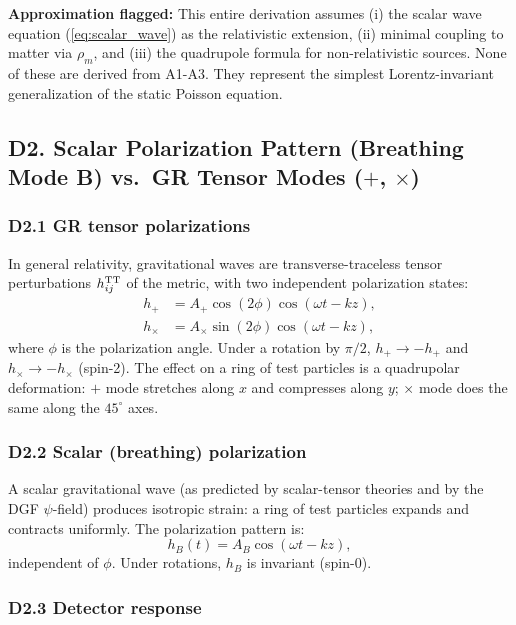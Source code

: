 \documentclass[reprint]{revtex4-2}
\begin{document}
\textbf{Approximation flagged:} This entire derivation assumes (i) the scalar wave equation (\ref{eq:scalar_wave}) as the relativistic extension, (ii) minimal coupling to matter via $\rho_m$, and (iii) the quadrupole formula for non-relativistic sources. None of these are derived from A1-A3. They represent the simplest Lorentz-invariant generalization of the static Poisson equation.

\subsection{D2. Scalar Polarization Pattern (Breathing Mode B) vs.\ GR Tensor Modes ($+$, $\times$)}

\subsubsection{D2.1 GR tensor polarizations}

In general relativity, gravitational waves are transverse-traceless tensor perturbations $h_{ij}^{\rm TT}$ of the metric, with two independent polarization states:
\begin{align}
h_+ &= A_+ \cos(2\phi)\cos(\omega t - kz),\\
h_\times &= A_\times \sin(2\phi)\cos(\omega t - kz),
\end{align}
where $\phi$ is the polarization angle. Under a rotation by $\pi/2$, $h_+ \to -h_+$ and $h_\times \to -h_\times$ (spin-2). The effect on a ring of test particles is a quadrupolar deformation: $+$ mode stretches along $x$ and compresses along $y$; $\times$ mode does the same along the $45^\circ$ axes.

\subsubsection{D2.2 Scalar (breathing) polarization}

A scalar gravitational wave (as predicted by scalar-tensor theories and by the DGF $\psi$-field) produces isotropic strain: a ring of test particles expands and contracts uniformly. The polarization pattern is:
\begin{equation}
h_B(t) = A_B \cos(\omega t - kz),
\end{equation}
independent of $\phi$. Under rotations, $h_B$ is invariant (spin-0).

\subsubsection{D2.3 Detector response}
\end{document}
